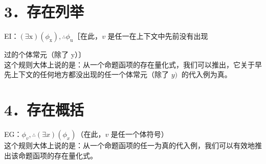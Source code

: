 \section*{3．存在列举}
EI：$(\exists \mathrm{x})\left(\phi_{\mathrm{x}}\right), \therefore \phi_{\mathrm{u}}$［在此，$v$ 是任一在上下文中先前没有出现

过的个体常元（除了 y）〕\\
这个规则大体上说的是：从一个命题函项的存在量化式，我们可以推出，它关于早先上下文的任何地方都没出现的任一个体常元（除了 $y) ~$ 的代入例为真。

\section*{4．存在概括}
EG：$\phi_{v}, \therefore(\exists x)\left(\phi_{x}\right)$（在此，$v$ 是任一个体符号）\\
这个规则大体上说的是：从一个命题函项的任一为真的代入例，我们可以有效地推出该命题函项的存在量化式。 